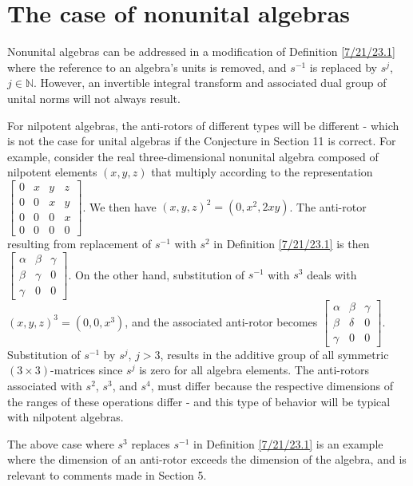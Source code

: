 \documentclass{amsart}
\numberwithin{equation}{section}
\theoremstyle{definition}
\numberwithin{theorem}{section}
\begin{document}
\section{The case of nonunital algebras} Nonunital algebras can be addressed in a modification of Definition \ref{7/21/23.1} where the reference to an algebra's units is removed, and $s^{-1}$ is replaced by $s^j$, $j \in \mathbb{N}$.   However, an invertible integral transform and associated dual group of unital norms will not always result.  

For nilpotent algebras, the anti-rotors of different types will be different - which is not the case for unital algebras if the Conjecture in Section 11 is correct.  For example, consider the real three-dimensional nonunital algebra composed of nilpotent elements $(x,y,z)$ that multiply according to the representation
  $ \left[
\begin{array}{ccccc}
0 & x & y & z  \\
0 & 0 & x & y \\
0 & 0 & 0 & x \\
0 & 0 & 0 & 0
\end{array}
\right] $.  We then have $(x,y,z)^2 = (0,x^2, 2xy)$.  The anti-rotor resulting from replacement of $s^{-1}$ with  $s^2$ in Definition \ref{7/21/23.1} is then $\left[
\begin{array}{ccccc}
\alpha & \beta & \gamma   \\
\beta & \gamma & 0 \\
\gamma & 0 & 0  
\end{array}
\right] $.  On the other hand, substitution of $s^{-1}$ with $s^3$  deals with $(x,y,z)^3 = (0,0, x^3)$, and the associated anti-rotor becomes $\left[
\begin{array}{ccccc}
\alpha & \beta & \gamma   \\
\beta & \delta & 0 \\
\gamma & 0 & 0  
\end{array}
\right] $.  Substitution of $s^{-1}$ by $s^j$, $j>3$, results in the additive group of all symmetric $(3\times 3)$-matrices since $s^j$ is zero for all algebra elements.  The anti-rotors associated with $s^2$, $s^3$, and $s^4$, must differ because the respective dimensions of the ranges of these operations differ - and this type of behavior will be typical with nilpotent algebras.  
 
The above case where $s^3$ replaces $s^{-1}$ in Definition \ref{7/21/23.1} is an example where the dimension of an anti-rotor exceeds the dimension of the algebra, and is relevant to comments made in Section 5.
\end{document}
